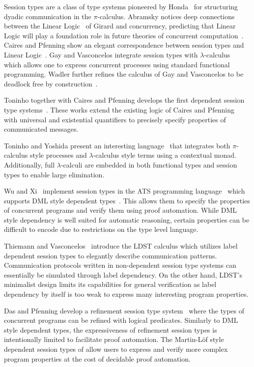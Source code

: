 Session types are a class of type systems pioneered by Honda~\cite{honda93} for
structuring dyadic communication in the $\pi$-calculus. Abramsky notices deep
connections between the Linear Logic~\cite{girard} of Girard and concurrency,
predicting that Linear Logic will play a foundation role in future theories of
concurrent computation~\cite{abramsky93,abramsky94}. Caires and Pfenning show an
elegant correspondence between session types and Linear Logic~\cite{caires10}.
Gay and Vasconcelos integrate session types with $\lambda$-calculus~\cite{gay10}
which allows one to express concurrent processes using standard functional
programming. Wadler further refines the calculus of Gay and Vasconcelos to be
deadlock free by construction~\cite{wadler12}.

Toninho together with Caires and Pfenning develops the first dependent session
type systems~\cite{toninho11,pfenning11}. These works extend the existing logic
of Caires and Pfenning~\cite{caires10} with universal and existential
quantifiers to precisely specify properties of communicated messages.

Toninho and Yoshida present an interesting language~\cite{toninho18} that
integrates both $\pi$-calculus style processes and $\lambda$-calculus style
terms using a contextual monad. Additionally, full $\lambda$-calculi are
embedded in both functional types and session types to enable large elimination.

Wu and Xi~\cite{wu17} implement session types in the ATS programming
language~\cite{ats} which supports DML style dependent types~\cite{dml}. This
allows them to specify the properties of concurrent programs and verify them
using proof automation. While DML style dependency is well suited for automatic
reasoning, certain properties can be difficult to encode due to restrictions on
the type level language.

Thiemann and Vasconcelos~\cite{ldst} introduce the LDST calculus which utilizes
label dependent session types to elegantly describe communication patterns.
Communication protocols written in non-dependent session type systems can
essentially be simulated through label dependency. On the other hand, LDST's
minimalist design limits its capabilities for general verification as label
dependency by itself is too weak to express many interesting program properties.

Das and Pfenning develop a refinement session type system~\cite{das20} where the
types of concurrent programs can be refined with logical predicates. Similarly
to DML style dependent types, the expressiveness of refinement session types is
intentionally limited to facilitate proof automation. The Martin-L\"{o}f style
dependent session types of \TLLC{} allow users to express and verify more
complex program properties at the cost of decidable proof automation.

